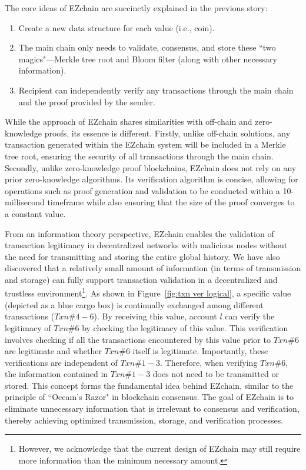 \documentclass[conference]{IEEEtran}
\begin{document}
The core ideas of EZchain are succinctly explained in the previous story:
\begin{enumerate}
	\item Create a new data structure for each value (i.e., coin).
	\item The main chain only needs to validate, consensus, and store these ``two magics"---Merkle tree root and Bloom filter (along with other necessary information).
	\item Recipient can independently verify any transactions through the main chain and the proof provided by the sender.
\end{enumerate}
While the approach of EZchain shares similarities with off-chain and zero-knowledge proofs, its essence is different. Firstly, unlike off-chain solutions, any transaction generated within the EZchain system will be included in a Merkle tree root, ensuring the security of all transactions through the main chain. Secondly, unlike zero-knowledge proof blockchains, EZchain does not rely on any prior zero-knowledge algorithms. Its verification algorithm is concise, allowing for operations such as proof generation and validation to be conducted within a 10-millisecond timeframe while also ensuring that the size of the proof converges to a constant value.

From an information theory perspective, EZchain enables the validation of transaction legitimacy in decentralized networks with malicious nodes without the need for transmitting and storing the entire global history. We have also discovered that a relatively small amount of information (in terms of transmission and storage) can fully support transaction validation in a decentralized and trustless environment\footnote{However, we acknowledge that the current design of EZchain may still require more information than the minimum necessary amount.}. As shown in Figure~\ref{fig:txn ver logical}, a specific value (depicted as a blue cargo box) is continually exchanged among different transactions ($Txn \#4-6$). By receiving this value, account $l$ can verify the legitimacy of $Txn \#6$ by checking the legitimacy of this value. This verification involves checking if all the transactions encountered by this value prior to $Txn \#6$ are legitimate and whether $Txn \#6$ itself is legitimate. Importantly, these verifications are independent of $Txn \#1-3$. Therefore, when verifying $Txn \#6$, the information contained in $Txn \#1-3$ does not need to be transmitted or stored. This concept forms the fundamental idea behind EZchain, similar to the principle of ``Occam's Razor" in blockchain consensus. The goal of EZchain is to eliminate unnecessary information that is irrelevant to consensus and verification, thereby achieving optimized transmission, storage, and verification processes.
\end{document}
